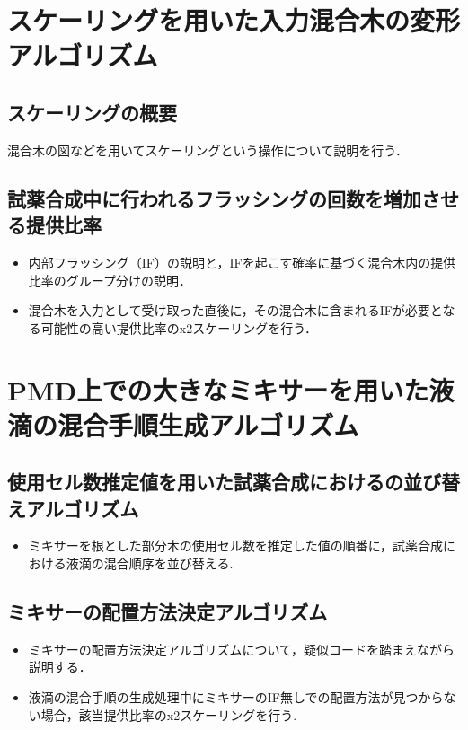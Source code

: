 \section{スケーリングを用いた入力混合木の変形アルゴリズム}
\subsection{スケーリングの概要}
混合木の図などを用いてスケーリングという操作について説明を行う．
\subsection{試薬合成中に行われるフラッシングの回数を増加させる提供比率}
\begin{itemize}
\item 内部フラッシング（IF）の説明と，IFを起こす確率に基づく混合木内の提供比率のグループ分けの説明\cite{1}\cite{2}．
\item 混合木を入力として受け取った直後に，その混合木に含まれるIFが必要となる可能性の高い提供比率のx2スケーリングを行う．
\end{itemize}
\section{PMD上での大きなミキサーを用いた液滴の混合手順生成アルゴリズム}
\subsection{使用セル数推定値を用いた試薬合成におけるの並び替えアルゴリズム}
\begin{itemize}
\item ミキサーを根とした部分木の使用セル数を推定した値の順番に，試薬合成における液滴の混合順序を並び替える.
\end{itemize}
\subsection{ミキサーの配置方法決定アルゴリズム}
\begin{itemize}
\item ミキサーの配置方法決定アルゴリズムについて，疑似コードを踏まえながら説明する．
\item 液滴の混合手順の生成処理中にミキサーのIF無しでの配置方法が見つからない場合，該当提供比率のx2スケーリングを行う.
\end{itemize}
